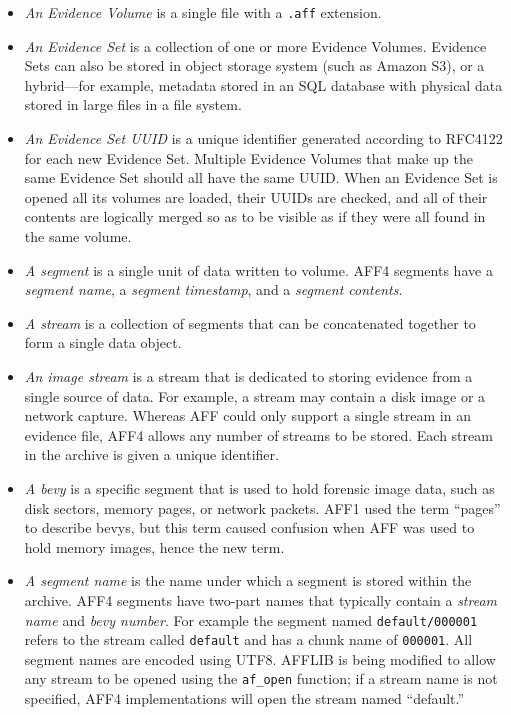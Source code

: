 \documentclass[10pt, conference]{IEEEtran}
\begin{document}
\begin{itemize}
\item \emph{An Evidence Volume} is a single file with a \texttt{.aff}
  extension. 
\item \emph{An Evidence Set} is a collection of one or more Evidence
  Volumes. Evidence Sets can also be stored in object storage system (such as
  Amazon S3), or a hybrid---for example, metadata stored in an SQL
  database with physical data stored in large files in a file
  system. 
\item \emph{An Evidence Set UUID} is a unique identifier generated
  according to RFC4122\cite{rfc4122} for each new Evidence
  Set. Multiple Evidence Volumes that make up the same Evidence Set
  should all have the same UUID. When an Evidence Set is opened all its volumes are
  loaded, their UUIDs are checked, and all of their contents are
  logically merged so as to be visible as if they were all found in the same volume.
\item \emph{A segment} is a single unit of data written to volume. AFF4
  segments have a \emph{segment name}, a \emph{segment timestamp}, and
  a \emph{segment contents}.

\item \emph{A stream} is a collection of segments that can be
  concatenated together to form a single data object.

\item \emph{An image stream} is a stream that is dedicated to storing evidence from a single
  source of data.  For example, a stream may contain a disk image or a network
  capture. Whereas AFF could only support a single stream in an evidence
  file, AFF4 allows any number of streams to be stored. Each stream in
  the archive is  given a unique identifier.

\item \emph{A bevy} is a specific segment that is used to hold
  forensic image data, such as disk sectors, memory pages, or network
  packets. AFF1 used the term ``pages'' to describe bevys, but this
  term caused confusion when AFF was used to hold memory images, hence the
  new term. 

\item \emph{A segment name} is the name under which a segment is
  stored within the archive. AFF4 segments have two-part names that
  typically contain a \emph{stream name} and \emph{bevy number}. For
  example the segment named \texttt{default/000001} refers to the stream
  called \texttt{default} and has a chunk name of \texttt{000001}. All segment
  names are encoded using UTF8. AFFLIB is being modified to allow any
  stream to be opened using the \texttt{af\_open} function; if a
  stream name is not specified, AFF4 implementations will open the
  stream named ``default.''


\end{itemize}
\end{document}
